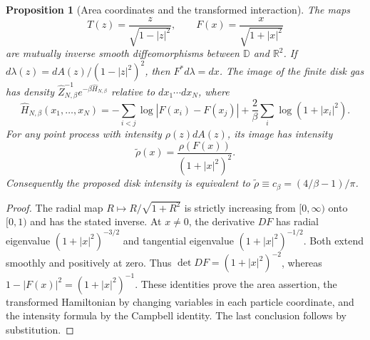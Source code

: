 \documentclass[11pt,a4paper]{article}
\numberwithin{equation}{section}
\newtheorem{proposition}[theorem]{Proposition}
\theoremstyle{definition}
\theoremstyle{remark}
\newcommand{\D}{\mathbb D}
\begin{document}
\begin{proposition}[Area coordinates and the transformed interaction]
\label{prop:screening-euclidean-area-map}
The maps
\[
 T(z)=\frac{z}{\sqrt{1-|z|^2}},\qquad
 F(x)=\frac{x}{\sqrt{1+|x|^2}}
\]
are mutually inverse smooth diffeomorphisms between $\D$ and
$\mathbb R^2$.  If $d\lambda(z)=dA(z)/(1-|z|^2)^2$, then
$F^*d\lambda=dx$.  The image of the finite disk gas has density
$\widehat Z_{N,\beta}^{-1}e^{-\beta\widehat H_{N,\beta}}$ relative
to $dx_1\cdots dx_N$, where
\begin{equation}
 \widehat H_{N,\beta}(x_1,\ldots,x_N)
 =-\sum_{i<j}\log|F(x_i)-F(x_j)|
       +\frac2\beta\sum_i\log(1+|x_i|^2).
 \label{eq:screening-euclidean-finite-hamiltonian}
\end{equation}
For any point process with intensity $\rho(z)dA(z)$, its image has
intensity
\begin{equation}
 \widetilde\rho(x)=\frac{\rho(F(x))}{(1+|x|^2)^2}.
 \label{eq:screening-euclidean-intensity-transform}
\end{equation}
Consequently the proposed disk intensity is equivalent to
$\widetilde\rho\equiv c_\beta=(4/\beta-1)/\pi$.
\end{proposition}

\begin{proof}
The radial map $R\mapsto R/\sqrt{1+R^2}$ is strictly increasing
from $[0,\infty)$ onto $[0,1)$ and has the stated inverse.  At
$x\ne0$, the derivative $DF$ has radial eigenvalue
$(1+|x|^2)^{-3/2}$ and tangential eigenvalue
$(1+|x|^2)^{-1/2}$.  Both extend smoothly and positively at zero.
Thus $\det DF=(1+|x|^2)^{-2}$, whereas
$1-|F(x)|^2=(1+|x|^2)^{-1}$.  These identities prove the area
assertion, the transformed Hamiltonian by changing variables in each
particle coordinate, and the intensity formula by the Campbell
identity.  The last conclusion follows by substitution.
\end{proof}
\end{document}
